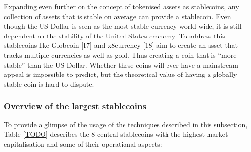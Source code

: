 \documentclass[english,]{IEEEtran}
\begin{document}
Expanding even further on the concept of tokenised assets as
stablecoins, any collection of assets that is stable on average can
provide a stablecoin. Even though the US Dollar is seen as the most
stable currency world-wide, it is still dependent on the stability of
the United States economy. To address this stablecoins like Globcoin
{[}17{]} and x8currency {[}18{]} aim to create an asset that tracks
multiple currencies as well as gold. Thus creating a coin that is ``more
stable'' than the US Dollar. Whether these coins will ever have a
mainstream appeal is impossible to predict, but the theoretical value of
having a globally stable coin is hard to dispute.

\subsubsection{Overview of the largest
stablecoins}\label{overview-of-the-largest-stablecoins}

To provide a glimpse of the usage of the techniques described in this
subsection, Table \ref{TODO} describes the 8 central stablecoins with
the highest market capitalisation and some of their operational aspects:
\end{document}
